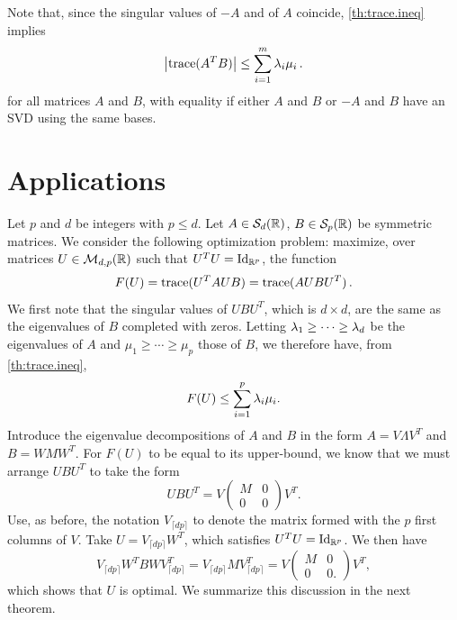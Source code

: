 \begin{remark}
Note that, since the singular values of $-A$ and of $A$ coincide, \cref{th:trace.ineq} implies
\begin{equation}
\label{eq:trace.ineq.abs}
\big|{\mathrm{trace}}(A^TB)\big| \leq \sum_{i=1}^m \lambda_i\mu_i\,.
\end{equation}
for all matrices $A$ and $B$, with equality if either $A$ and $B$ or $-A$ and $B$ have an SVD using the same bases. 
\end{remark}

\section{Applications}
Let $p$ and $d$ be integers with $p\leq d$.
Let $A\in {\mathcal S}_{d}({\mathbb{R}})$, $B\in {\mathcal S}_{p}({\mathbb{R}})$ be symmetric matrices.
We consider the following optimization problem: maximize, over  matrices $U\in {\mathcal M}_{d,p}({\mathbb{R}})$ such that $U^TU = \Id[p]$, the function
\[
F(U) = {\mathrm{trace}}(U^TAUB) = {\mathrm{trace}}(AUBU^T)\,.
\]
We first note that the singular values of $UBU^T$, which is $d\times d$, are the same as the eigenvalues of $B$ completed with zeros. Letting $\lambda_1 \geq \cdots \geq \lambda_d$ be the eigenvalues of $A$ and $\mu_1 \geq \cdots \geq \mu_p$ those of $B$, we therefore have, from \cref{th:trace.ineq},
\[
F(U) \leq \sum_{i=1}^p \lambda_i\mu_i.
\]
Introduce the eigenvalue decompositions of $A$ and $B$ in the form $A = V\Lambda V^T$ and $B = W M W^T$. For $F(U)$ to be equal to its upper-bound, we know that we must arrange $UBU^T$ to take the form
\[
UBU^T = V \begin{pmatrix}
M & 0\\ 0& 0
\end{pmatrix}
V^T.
\]
Use, as before, the notation $V_{\lceil dp\rceil}$ to denote the matrix formed with the $p$ first columns of $V$. Take $U = V_{\lceil dp\rceil}W^T$, which satisfies $U^TU = \Id[p]$. We then have
\[
V_{\lceil dp\rceil} W^T B W V_{\lceil dp\rceil}^T = V_{\lceil dp\rceil} M V_{\lceil dp\rceil}^T =  V \begin{pmatrix}
M & 0\\ 0& 0.
\end{pmatrix}
V^T,
\]
which shows that $U$ is optimal. 
We summarize this discussion in the next theorem.

